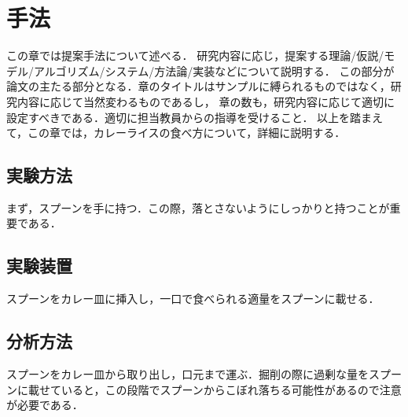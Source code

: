 \chapter{手法}	%
\thispagestyle{plain}   %

この章では提案手法について述べる．
研究内容に応じ，提案する理論/仮説/モデル/アルゴリズム/システム/方法論/実装などについて説明する．
この部分が論文の主たる部分となる．章のタイトルはサンプルに縛られるものではなく，研究内容に応じて当然変わるものであるし，
章の数も，研究内容に応じて適切に設定すべきである．適切に担当教員からの指導を受けること．
以上を踏まえて，この章では，カレーライスの食べ方について，詳細に説明する．

\section{実験方法}
まず，スプーンを手に持つ．この際，落とさないようにしっかりと持つことが重要である．

\section{実験装置}
スプーンをカレー皿に挿入し，一口で食べられる適量をスプーンに載せる．

\section{分析方法}
スプーンをカレー皿から取り出し，口元まで運ぶ．掘削の際に過剰な量をスプーンに載せていると，この段階でスプーンからこぼれ落ちる可能性があるので注意が必要である．

